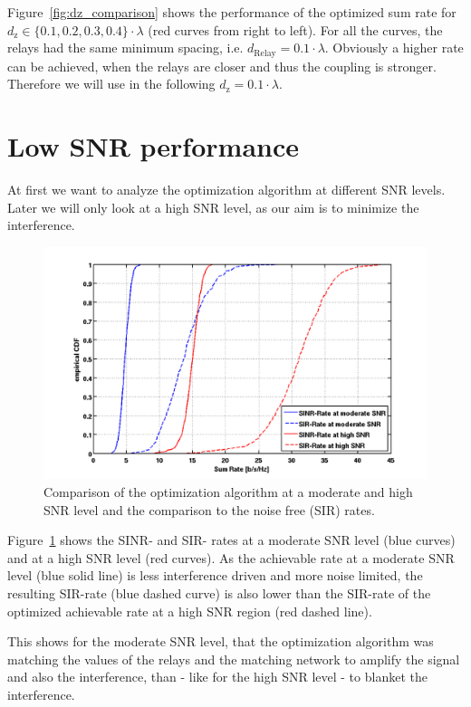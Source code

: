 Figure~\ref{fig:dz_comparison} shows the performance of the optimized sum rate for $d_\text{z}\in\{0.1,0.2,0.3,0.4\}\cdot\lambda$ (red curves from right to left).
For all the curves, the relays had the same minimum spacing, i.e. $d_\text{Relay}=0.1\cdot\lambda$.
Obviously a higher rate can be achieved, when the relays are closer and thus the coupling is stronger.
Therefore we will use in the following $d_\text{z}=0.1\cdot\lambda$.


\section{Low SNR performance}
\label{sec:low_snr}

At first we want to analyze the optimization algorithm at different SNR levels.
Later we will only look at a high SNR level, as our aim is to minimize the interference.
\begin{figure}[h]
\centering
  \includegraphics[width=0.9\linewidth]{images/Comparison_modvshighSNR.png}
\caption{Comparison of the optimization algorithm at a moderate and high SNR level and the comparison to the noise free (SIR) rates.}
\label{fig:snrcomparison}
\end{figure}

Figure~\ref{fig:snrcomparison} shows the SINR- and SIR- rates at a moderate SNR level (blue curves) and at a high SNR level (red curves).
As the achievable rate at a moderate SNR level (blue solid line) is less interference driven and more noise limited, the resulting SIR-rate (blue dashed curve) is also lower than the SIR-rate of the optimized achievable rate at a high SNR region (red dashed line).

This shows for the moderate SNR level, that the optimization algorithm was matching the values of the relays and the matching network to amplify the signal and also the interference, than - like for the high SNR level - to blanket the interference.

